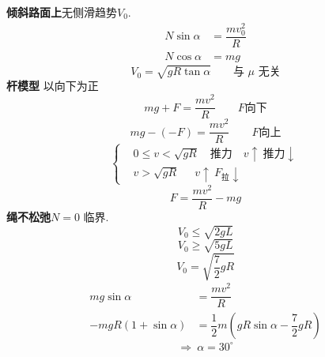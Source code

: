 \textbf{倾斜路面上}\quad 无侧滑趋势\quad $V_0$.
\begin{align*}
N\sin\alpha&=\dfrac{mv_0^2}{R}\\
N\cos\alpha&=mg
\end{align*}
\[ V_0=\sqrt{gR\tan\alpha}\qquad\text{与 }\mu\text{ 无关} \]
\textbf{杆模型}
以向下为正
\[ mg+F=\dfrac{mv^2}{R}\qquad F\text{向下} \]
\[ mg-(-F)=\dfrac{mv^2}{R}\qquad F\text{向上} \]
\[
\left\{\begin{aligned}
&0\le v<\sqrt{gR}\quad\text{推力}\quad v\uparrow\ \text{推力}\downarrow\\
&v>\sqrt{gR}\quad\ \ v\uparrow\ F_{\text{拉}}\downarrow
\end{aligned}\right.
\]
\[ F=\dfrac{mv^2}{R}-mg \]
\textbf{绳不松弛}\quad $N=0$ 临界.
\[ V_0\le\sqrt{2gL} \]
\[ V_0\ge\sqrt{5gL} \]
\[ V_0=\sqrt{\dfrac{7}{2}gR} \]
\begin{align*}
mg\sin\alpha&=\dfrac{mv^2}{R}\\
-mgR(1+\sin\alpha)&=\dfrac12m\left(gR\sin\alpha-\dfrac{7}{2}gR\right)
\end{align*}
\[ \Rightarrow\ \alpha=30^\circ \]
